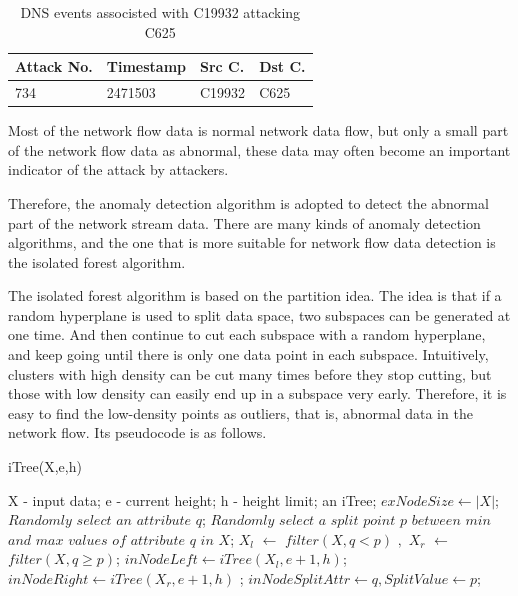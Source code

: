 \documentclass[12pt,journal,draftcls,doublespace, letterpaper,onecolumn]{IEEEtran}
\begin{document}
\begin{table}[h]
	\caption{DNS events associsted with C19932 attacking C625}
	\vspace{1pt}
	\centering
	\begin{tabular}{p{2.5cm}p{2.5cm}p{2.5cm}p{2.5cm}}
		\hline
		Attack No. & Timestamp & Src C. & Dst C. \\
		\hline
		734 & 2471503 & C19932 & C625\\
		\hline       
	\end{tabular}
	\label{bs2}
\end{table}

Most of the network flow data is normal network data flow, but only a small part of the network flow data as abnormal, these data may often become an important indicator of the attack by attackers. 

Therefore, the anomaly detection algorithm is adopted to detect the abnormal part of the network stream data. There are many kinds of anomaly detection algorithms, and the one that is more suitable for network flow data detection is the isolated forest algorithm. 

The isolated forest algorithm is based on the partition idea. The idea is that if a random hyperplane is used to split data space, two subspaces can be generated at one time. And then continue to cut each subspace with a random hyperplane, and keep going until there is only one data point in each subspace. Intuitively, clusters with high density can be cut many times before they stop cutting, but those with low density can easily end up in a subspace very early. Therefore, it is easy to find the low-density points as outliers, that is, abnormal data in the network flow. Its pseudocode is as follows.

\begin{algorithm}[h]  
	\caption{iTree(X,e,h)}  
	\begin{algorithmic}[1] 
		\Require  
		X - input data;  
		e - current height;  
		h - height limit;  
		\Ensure  
		an iTree; 
		\Return $exNode{Size \leftarrow |X|}$;
		\Else
		\State $Randomly$ $select$ $an$ $attribute$ $q$;
		\State $Randomly$ $select$ $a$ $split$ $point$ $p$ $between$ $min$ $and$ $max$ $values$ $of$ $attribute$ $q$ $in$ $X$;
		\State $X_l$ $\leftarrow$ $filter(X,q < p)$ $,$ $X_r$ $\leftarrow$ $filter(X,q \geq p)$;
		\State	
		\Return $inNode{Left \leftarrow iTree(X_l,e+1,h)}$;	
		\State		
		\Return	$inNode{Right \leftarrow iTree(X_r,e+1,h)}$	;
		\State	
		\Return $inNode{SplitAttr \leftarrow q,SplitValue \leftarrow p}$;
		\EndIf 
		\label{code:recentEnd}  
	\end{algorithmic}  
\end{algorithm}  
\end{document}
